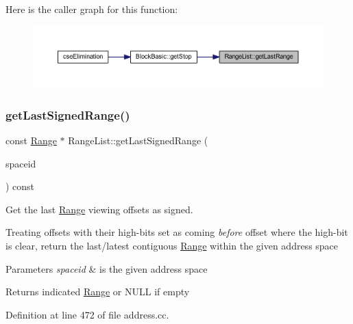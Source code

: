 Here is the caller graph for this function\+:
\nopagebreak
\begin{figure}[H]
\begin{center}
\leavevmode
\includegraphics[width=350pt]{class_range_list_a335abcacfeb584ef9684d60adfce11b9_icgraph}
\end{center}
\end{figure}
\mbox{\label{class_range_list_af9a80345a7c9f95568c00f6f1dbe2673}} 
\subsubsection{\texorpdfstring{getLastSignedRange()}{getLastSignedRange()}}
{\footnotesize\ttfamily const \mbox{\hyperlink{class_range}{Range}} $\ast$ Range\+List\+::get\+Last\+Signed\+Range (\begin{DoxyParamCaption}\item[{\mbox{\hyperlink{class_addr_space}{Addr\+Space}} $\ast$}]{spaceid }\end{DoxyParamCaption}) const}



Get the last \mbox{\hyperlink{class_range}{Range}} viewing offsets as signed. 

Treating offsets with their high-\/bits set as coming {\itshape before} offset where the high-\/bit is clear, return the last/latest contiguous \mbox{\hyperlink{class_range}{Range}} within the given address space 
\begin{DoxyParams}{Parameters}
{\em spaceid} & is the given address space \\
\hline
\end{DoxyParams}
\begin{DoxyReturn}{Returns}
indicated \mbox{\hyperlink{class_range}{Range}} or N\+U\+LL if empty 
\end{DoxyReturn}


Definition at line 472 of file address.\+cc.


